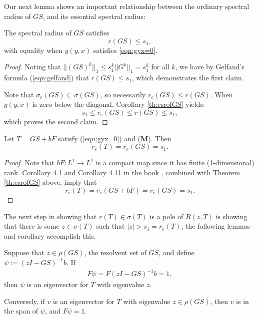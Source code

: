 Our next lemma shows an important relationship between the ordinary spectral radius of $GS$, and its essential spectral radius:

\begin{lemma} \label{th:srofGS}
	The spectral radius of $GS$ satisfies
	\[r(GS) \leq s_1,\]
	with equality when $g(y,x)$ satisfies \eqref{eqn:gyx=0}.
\end{lemma}

\begin{proof}
	Noting that $||(GS)^k||_1 \leq s_1^k ||G^k||_1 = s_1^k$ for all $k$, we have by Gelfand's formula (\ref{eqn:gelfand}) that $r(GS)\leq s_1$, which demonstrates the first claim.
	
	Note that $\sigma_e(GS) \subseteq \sigma(GS)$, so necessarily $r_e(GS) \leq r(GS)$. When $g(y,x)$ is zero below the diagonal, Corollary \ref{th:esrofGS} yields:
	\[s_1 \leq r_e(GS) \leq r(GS) \leq s_1,\]
	which proves the second claim.
	
\end{proof}

\begin{lemma} \label{th:reiss1}
	Let $T = GS + bF$ satisfy (\ref{eqn:gyx=0}) and (\textbf{M}). Then 
	\[r_e(T) = r_e(GS) = s_1.\]
\end{lemma}

\begin{proof}
	Note that $bF:L^1 \to L^1$ is a compact map since it has finite (1-dimensional) rank. Corollary 4.1 and Corollary 4.11 in the book \cite{Edmunds1987}, combined with Theorem \ref{th:esrofGS} above, imply that
	\[r_e(T) = r_e(GS + bF) = r_e(GS) = s_1.\]
	
\end{proof}

The next step in showing that $r(T) \in \sigma(T)$ is a pole of $R(z, T)$ is showing that there is some $z \in \sigma(T)$ such that $|z| > s_1 = r_e(T)$; the following lemmas and corollary accomplish this.

\begin{lemma} \label{th:eigenvector}
	Suppose that $z \in \rho(GS)$, the resolvent set of $GS$, and define $\psi:= (z I - GS)^{-1}b$. If
	\begin{align}
	F \psi = F(z I - GS)^{-1}b = 1, \label{eqn:evecformula}
	\end{align}
	then $\psi$ is an eigenvector for $T$ with eigenvalue $z$.
	
	Conversely, if $v$ is an eigenvector for $T$ with eigenvalue $z \in \rho(GS)$, then $v$ is in the span of $\psi$, and $F\psi = 1$.
\end{lemma}

